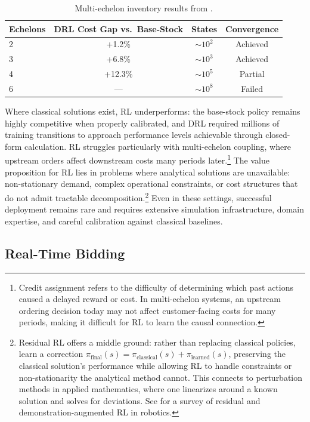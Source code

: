 \begin{table}[htbp]
\centering
\caption{Multi-echelon inventory results from \citet{Gijsbrechts2022inventory}.}
\label{tab:inventory_results}
\begin{tabular}{lccc}
\toprule
Echelons & DRL Cost Gap vs.\ Base-Stock & States & Convergence \\
\midrule
2 & +1.2\% & $\sim 10^2$ & Achieved \\
3 & +6.8\% & $\sim 10^3$ & Achieved \\
4 & +12.3\% & $\sim 10^5$ & Partial \\
6 & --- & $\sim 10^8$ & Failed \\
\bottomrule
\end{tabular}
\end{table}

Where classical solutions exist, RL underperforms: the base-stock policy remains highly competitive when properly calibrated, and DRL required millions of training transitions to approach performance levels achievable through closed-form calculation. RL struggles particularly with multi-echelon coupling, where upstream orders affect downstream costs many periods later.\footnote{Credit assignment refers to the difficulty of determining which past actions caused a delayed reward or cost. In multi-echelon systems, an upstream ordering decision today may not affect customer-facing costs for many periods, making it difficult for RL to learn the causal connection.} The value proposition for RL lies in problems where analytical solutions are unavailable: non-stationary demand, complex operational constraints, or cost structures that do not admit tractable decomposition.\footnote{Residual RL \citep{Silver2018residual} offers a middle ground: rather than replacing classical policies, learn a correction $\pi_{\mathrm{final}}(s) = \pi_{\mathrm{classical}}(s) + \pi_{\mathrm{learned}}(s)$, preserving the classical solution's performance while allowing RL to handle constraints or non-stationarity the analytical method cannot. This connects to perturbation methods in applied mathematics, where one linearizes around a known solution and solves for deviations. See \citet{Ibarz2021robot} for a survey of residual and demonstration-augmented RL in robotics.} Even in these settings, successful deployment remains rare and requires extensive simulation infrastructure, domain expertise, and careful calibration against classical baselines.


\subsection{Real-Time Bidding}
\label{sec:rtb}

